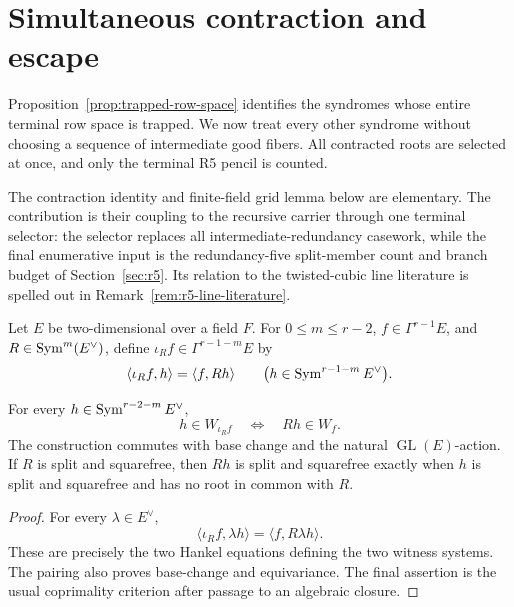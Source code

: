 \section{Simultaneous contraction and escape}
\label{sec:simultaneous-contraction}

Proposition~\ref{prop:trapped-row-space} identifies the syndromes whose
entire terminal row space is trapped.  We now treat every other syndrome
without choosing a sequence of intermediate good fibers.  All contracted roots are selected at
once, and only the terminal R5 pencil is counted.

The contraction identity and finite-field grid lemma below are elementary.
The contribution is their coupling to the recursive carrier through one
terminal selector: the selector replaces all intermediate-redundancy casework,
while the final enumerative input is the redundancy-five split-member count
and branch budget of
Section~\ref{sec:r5}.  Its relation to the twisted-cubic line literature is
spelled out in Remark~\ref{rem:r5-line-literature}.

Let \(E\) be two-dimensional over a field \(F\).  For \(0\leq m\leq r-2\),
\(f\in\Gamma^{r-1}E\), and \(R\in\operatorname{Sym}^m(E^\vee)\), define
\(\iota_Rf\in\Gamma^{r-1-m}E\) by
\begin{equation}\label{eq:composite-contraction}
 \langle\iota_Rf,h\rangle=\langle f,Rh\rangle
 \qquad\bigl(h\in\operatorname{Sym}^{r-1-m}E^\vee\bigr).
\end{equation}

\begin{proposition}
\label{thm:composite-contraction}%
%
For every \(h\in\operatorname{Sym}^{r-2-m}E^\vee\),
\[
 h\in W_{\iota_Rf}\quad\Longleftrightarrow\quad Rh\in W_f.
\]
The construction commutes with base change and the natural
\(\operatorname{GL}(E)\)-action.  If \(R\) is split and squarefree, then
\(Rh\) is split and squarefree exactly when \(h\) is split and squarefree and
has no root in common with \(R\).
\end{proposition}

\begin{proof}
For every \(\lambda\in E^\vee\),
\[
 \langle\iota_Rf,\lambda h\rangle
   =\langle f,R\lambda h\rangle.
\]
These are precisely the two Hankel equations defining the two witness
systems.  The pairing also proves base-change and equivariance.  The final
assertion is the usual coprimality criterion after passage to an algebraic
closure.
\end{proof}

